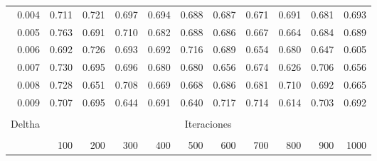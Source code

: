 \begin{table}[H]
\begin{tabular}{rrrrrrrrrrr}
0.004                      & 0.711                & 0.721                & 0.697                & 0.694                & 0.688                & 0.687                & 0.671                & 0.691                & 0.681                & 0.693                \\
0.005                      & 0.763                & 0.691                & 0.710                & 0.682                & 0.688                & 0.686                & 0.667                & 0.664                & 0.684                & 0.689                \\
0.006                      & 0.692                & 0.726                & 0.693                & 0.692                & 0.716                & 0.689                & 0.654                & 0.680                & 0.647                & 0.605                \\
0.007                      & 0.730                & 0.695                & 0.696                & 0.680                & 0.680                & 0.656                & 0.674                & 0.626                & 0.706                & 0.656                \\
0.008                      & 0.728                & 0.651                & 0.708                & 0.669                & 0.668                & 0.686                & 0.681                & 0.710                & 0.692                & 0.665                \\
0.009                      & 0.707                & 0.695                & 0.644                & 0.691                & 0.640                & 0.717                & 0.714                & 0.614                & 0.703                & 0.692                \\ \hline
\multicolumn{1}{l}{}       & \multicolumn{1}{l}{} & \multicolumn{1}{l}{} & \multicolumn{1}{l}{} & \multicolumn{1}{l}{} & \multicolumn{1}{l}{} & \multicolumn{1}{l}{} & \multicolumn{1}{l}{} & \multicolumn{1}{l}{} & \multicolumn{1}{l}{} & \multicolumn{1}{l}{} \\
\multicolumn{1}{l}{Deltha} & \multicolumn{10}{c}{Iteraciones}    \\ \hline                                                                                                                                                                                                  \\
\multicolumn{1}{l}{}       & 100                  & 200                  & 300                  & 400                  & 500                  & 600                  & 700                  & 800                  & 900                  & 1000                 \\

\end{tabular}
\end{table}
